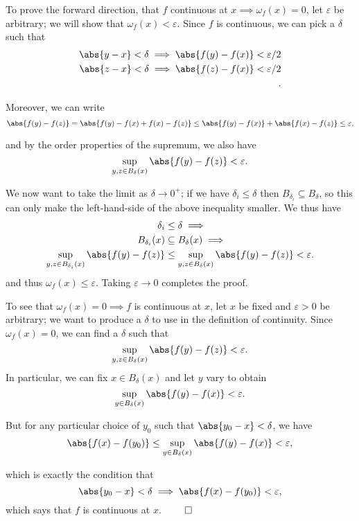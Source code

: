 \begin{solution}
\begin{enumerate}
    To prove the forward direction, that $f$ continuous at $x \implies \omega_f(x) = 0$, let $\varepsilon$ be arbitrary; we will show that $\omega_f(x) < \varepsilon$. Since $f$ is continuous, we can pick a $\delta$ such that
\[
  \begin{align*}
    \abs{y-x} < \delta \implies \abs{f(y) - f(x)} < \varepsilon/2 \\
    \abs{z-x} < \delta \implies \abs{f(z) - f(x)} < \varepsilon/2 \\
  .\end{align*}
\]

  Moreover, we can write
  $$
  \abs{f(y) - f(z)} = \abs{f(y) - f(x) + f(x) - f(z)} \leq \abs{f(y) - f(x)} + \abs{f(x) - f(z)} \leq \varepsilon,
  $$

  and by the order properties of the supremum, we also have
  $$
  \sup_{y, z \in B_\delta(x)} \abs{f(y) - f(z)} < \varepsilon.
  $$

  We now want to take the limit as $\delta \to 0^+$; if we have $\delta_i \leq \delta$ then $B_{\delta_i} \subseteq B_{\delta}$, so this can only make the left-hand-side of the above inequality smaller. We thus have
\[
\begin{align*}
  \delta_i &\leq \delta \implies \\
  B_{\delta_i}(x) &\subseteq B_\delta(x) \implies \\
  \sup_{y, z \in B_{\delta_i}(x)} \abs{f(y) - f(z)} &\leq
  \sup_{y, z \in B_\delta(x)} \abs{f(y) - f(z)} < \varepsilon
.\end{align*}
\]
  and thus $\omega_f(x) \leq \varepsilon$. Taking $\varepsilon \to 0$ completes the proof.

  To see that $\omega_f(x) = 0 \implies f$ is continuous at $x$, let $x$ be fixed and $\varepsilon > 0$ be arbitrary; we want to produce a $\delta$ to use in the definition of continuity. Since $\omega_f(x) = 0$, we can find a $\delta$ such that
  $$
  \sup_{y, z \in B_\delta(x)} \abs{f(y) - f(z)} < \varepsilon.
  $$
  In particular, we can fix $x\in B_\delta(x)$ and let $y$ vary to obtain
  $$
  \sup_{y\in B_\delta(x)} \abs{f(y) - f(x)} < \varepsilon.
  $$

  But for any particular choice of $y_0$ such that $\abs{y_0 - x} < \delta$, we have
  $$
  \abs{f(x) - f(y_0)} \leq\sup_{y\in B_\delta(x)} \abs{f(y) - f(x)} < \varepsilon,
  $$

  which is exactly the condition that
  $$
  \abs{y_0 - x} < \delta \implies \abs{f(x) - f(y_0)} < \varepsilon,
  $$
  which says that $f$ is continuous at $x$. $\qed$


\end{enumerate}
\end{solution}

